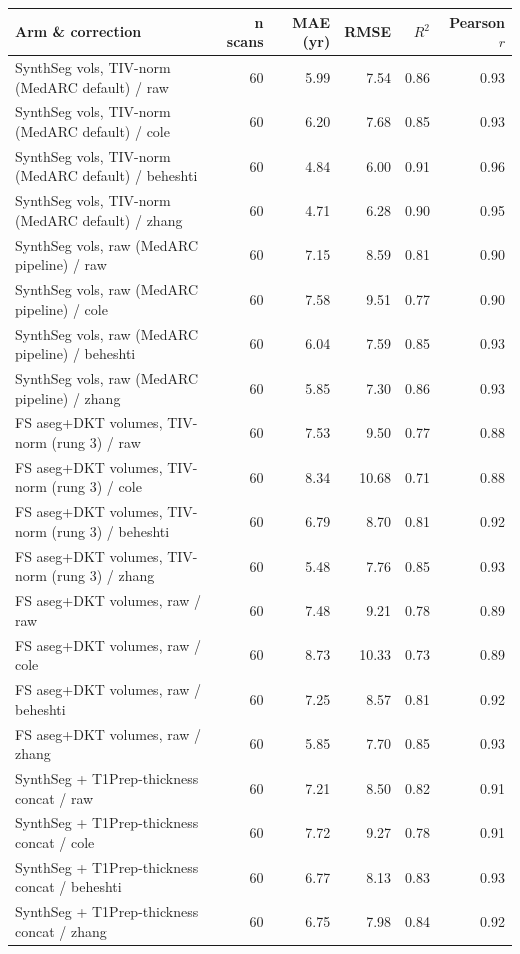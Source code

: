 \documentclass[11pt]{article}
\begin{document}
\begin{center}
\begin{tabular}{lrrrrr}
\toprule
Arm \& correction & n scans & MAE (yr) & RMSE & $R^2$ & Pearson $r$ \\
\midrule
SynthSeg vols, TIV-norm (MedARC default) / raw & 60 & 5.99 & 7.54 & 0.86 & 0.93 \\
SynthSeg vols, TIV-norm (MedARC default) / cole & 60 & 6.20 & 7.68 & 0.85 & 0.93 \\
SynthSeg vols, TIV-norm (MedARC default) / beheshti & 60 & 4.84 & 6.00 & 0.91 & 0.96 \\
SynthSeg vols, TIV-norm (MedARC default) / zhang & 60 & 4.71 & 6.28 & 0.90 & 0.95 \\
SynthSeg vols, raw (MedARC pipeline) / raw & 60 & 7.15 & 8.59 & 0.81 & 0.90 \\
SynthSeg vols, raw (MedARC pipeline) / cole & 60 & 7.58 & 9.51 & 0.77 & 0.90 \\
SynthSeg vols, raw (MedARC pipeline) / beheshti & 60 & 6.04 & 7.59 & 0.85 & 0.93 \\
SynthSeg vols, raw (MedARC pipeline) / zhang & 60 & 5.85 & 7.30 & 0.86 & 0.93 \\
FS aseg+DKT volumes, TIV-norm (rung 3) / raw & 60 & 7.53 & 9.50 & 0.77 & 0.88 \\
FS aseg+DKT volumes, TIV-norm (rung 3) / cole & 60 & 8.34 & 10.68 & 0.71 & 0.88 \\
FS aseg+DKT volumes, TIV-norm (rung 3) / beheshti & 60 & 6.79 & 8.70 & 0.81 & 0.92 \\
FS aseg+DKT volumes, TIV-norm (rung 3) / zhang & 60 & 5.48 & 7.76 & 0.85 & 0.93 \\
FS aseg+DKT volumes, raw / raw & 60 & 7.48 & 9.21 & 0.78 & 0.89 \\
FS aseg+DKT volumes, raw / cole & 60 & 8.73 & 10.33 & 0.73 & 0.89 \\
FS aseg+DKT volumes, raw / beheshti & 60 & 7.25 & 8.57 & 0.81 & 0.92 \\
FS aseg+DKT volumes, raw / zhang & 60 & 5.85 & 7.70 & 0.85 & 0.93 \\
SynthSeg + T1Prep-thickness concat / raw & 60 & 7.21 & 8.50 & 0.82 & 0.91 \\
SynthSeg + T1Prep-thickness concat / cole & 60 & 7.72 & 9.27 & 0.78 & 0.91 \\
SynthSeg + T1Prep-thickness concat / beheshti & 60 & 6.77 & 8.13 & 0.83 & 0.93 \\
SynthSeg + T1Prep-thickness concat / zhang & 60 & 6.75 & 7.98 & 0.84 & 0.92 \\

\end{tabular}
\end{center}
\end{document}
